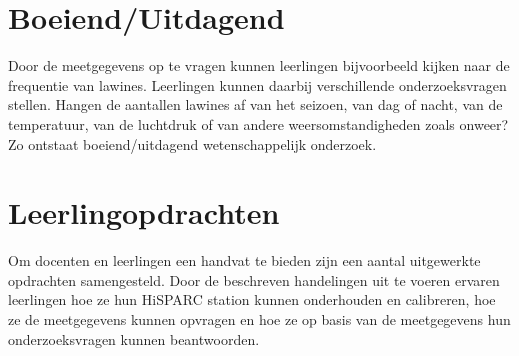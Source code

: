 \section{Boeiend/Uitdagend}

Door de meetgegevens op te vragen kunnen leerlingen bijvoorbeeld kijken
naar de frequentie van lawines.  Leerlingen kunnen daarbij verschillende
onderzoeksvragen stellen. Hangen de aantallen lawines af van het
seizoen, van dag of nacht, van de temperatuur, van de luchtdruk of van
andere weersomstandigheden zoals onweer? Zo ontstaat boeiend/uitdagend
wetenschappelijk onderzoek. 


\section{Leerlingopdrachten}

Om docenten en leerlingen een handvat te bieden zijn een aantal
uitgewerkte opdrachten samengesteld. Door de beschreven handelingen uit
te voeren ervaren leerlingen hoe ze hun HiSPARC station kunnen
onderhouden en calibreren, hoe ze de meetgegevens kunnen opvragen en hoe
ze op basis van de meetgegevens hun onderzoeksvragen kunnen beantwoorden.


